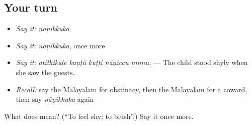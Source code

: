 \subsection*{Your turn}
\begin{itemize}
\raggedright
  \item \emph{Say it:} \emph{nāṇikkuka}
  \item \emph{Say it:} \emph{nāṇikkuka}, once more
  \item \emph{Say it:} \emph{atithikaḷe kaṇṭŭ kuṭṭi nāṇiccu ninnu.} — The child stood shyly when she saw the guests.
  \item \emph{Recall:} say the Malayalam for obstinacy, then the Malayalam for a coward, then say \emph{nāṇikkuka} again
\end{itemize}

\begin{tcolorbox}[breakable,colback=teal!4,colframe=teal!35!black,title={Before you move on}]
What does  mean? (\textquotedblleft{}To feel shy; to blush\textquotedblright{}.) Say it once more.
\end{tcolorbox}
